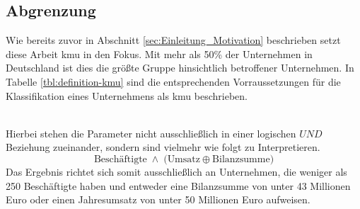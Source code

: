 \documentclass[11pt,a4paper,hidelinks]{article}   %
\begin{document}
    \subsection{Abgrenzung}                                                                 %
        Wie bereits zuvor in Abschnitt \ref{sec:Einleitung_Motivation} beschrieben setzt diese Arbeit \gls{kmu} in den Fokus. Mit mehr als 50\% der Unternehmen in Deutschland ist dies die größte Gruppe hinsichtlich betroffener Unternehmen. In Tabelle \ref{tbl:definition-kmu} sind die entsprechenden Vorraussetzungen für die Klassifikation eines Unternehmens als \gls{kmu} beschrieben. 
        \begin{table}[ht]
            \caption[Definition von kleinen und mittleren Unternehmen]{Definition von kleinen und mittleren Unternehmen\footnotemark}
            \label{tbl:definition-kmu}
        \end{table} \\
        Hierbei stehen die Parameter nicht ausschließlich in einer logischen \(UND\) Beziehung zueinander, sondern sind vielmehr wie folgt zu Interpretieren.
            \[
            \text{Besch\"aftigte} \;\land\;
            \bigl( \text{Umsatz} \oplus \text{Bilanzsumme} \bigr)
            \]
        Das Ergebnis richtet sich somit ausschließlich an Unternehmen, die weniger als 250 Beschäftigte haben und entweder eine Bilanzsumme von unter 43 Millionen Euro oder einen Jahresumsatz von unter 50 Millionen Euro aufweisen.
\end{document}
